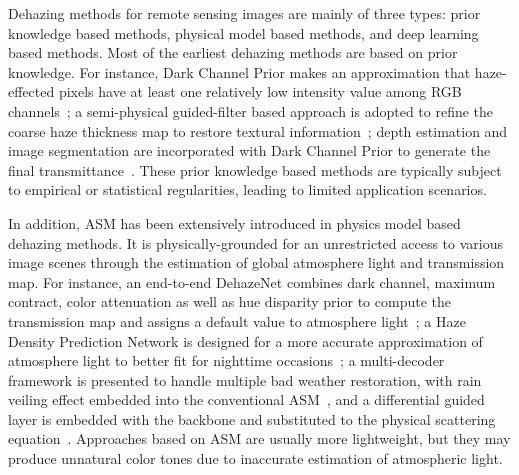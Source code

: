 \documentclass[lettersize,journal]{IEEEtran}
\begin{document}

Dehazing methods for remote sensing images are mainly of three types: prior knowledge based methods, physical model based methods, and deep learning based methods. Most of the earliest dehazing methods are based on prior knowledge. For instance, Dark Channel Prior makes an approximation that haze-effected pixels have at least one relatively low intensity value among RGB channels~\cite{li2020nasa};  a semi-physical guided-filter based approach is adopted to refine the coarse haze thickness map to restore textural information~\cite{liu2021semiphysical}; depth estimation and image segmentation are incorporated with Dark Channel Prior to generate the final transmittance~\cite{xie2021image}. These prior knowledge based methods are typically subject to empirical or statistical regularities, leading to limited application scenarios.

In addition, ASM has been extensively introduced in physics model based dehazing methods. It is physically-grounded for an unrestricted access to various image scenes through the estimation of global atmosphere light and transmission map. For instance, an end-to-end DehazeNet combines dark channel, maximum contract, color attenuation as well as hue disparity prior to compute the transmission map and assigns a default value to atmosphere light~\cite{cai2016dehazenet}; a Haze Density Prediction Network is designed for a more accurate approximation of atmosphere light to better fit for nighttime occasions~\cite{liao2018hdp}; a multi-decoder framework is presented to handle multiple bad weather restoration, with rain veiling effect embedded into the conventional ASM~\cite{li2020all}, and a differential guided layer is embedded with the backbone and substituted to the physical scattering equation\textcolor{red}{~\cite{jiao2021guided}}. Approaches based on ASM are usually more lightweight, but they may produce unnatural color tones due to inaccurate estimation of atmospheric light.
\end{document}
